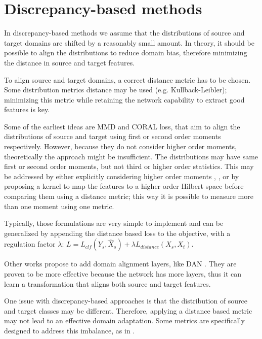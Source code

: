 \section{Discrepancy-based methods}
In discrepancy-based methods we assume that the distributions of source and target domains are shifted by a reasonably small amount. In theory, it should be possible to align the distributions to reduce domain bias, therefore minimizing the distance in source and target features.

To align source and target domains, a correct distance metric has to be chosen. Some distribution metrics  distance may be used (e.g. Kullback-Leibler); minimizing this metric while retaining the network capability to extract good features is key.

Some of the earliest ideas are MMD \cite[Tzeng et al.]{mmd} and CORAL \cite[Sun et al.]{coral} loss, that aim to align the distributions of source and target using first or second order moments respectively.
However, because they do not consider higher order moments, theoretically the approach might be insufficient. The distributions may have same first or second order moments, but not third or higher order statistics. This may be addressed by either explicitly considering higher order moments \cite[Zellinger et al.]{Zellinger_2019}, \cite[Chen et al.]{hmmd}, or by  proposing a kernel \cite[Wang et al]{kernel} to map the features to a higher order Hilbert space before comparing them using a distance metric; this way it is possible to measure more than one moment using one metric.

Typically, those formulations are very simple to implement and can be generalized by appending the distance based loss to the objective, with a regulation factor $\lambda$:
$ L = L_{clf}(Y_s,\hat X_s) + \lambda L_{distance}(X_s,X_t)$.

Other works propose to add domain alignment layers, like DAN \cite[Long et al]{DAN}. They are proven to be more effective because the network has more layers, thus it can learn a transformation that aligns both source and target features.

One issue with discrepancy-based approaches is that the distribution of source and target classes may be different. Therefore, applying a distance based metric may not lead to an effective domain adaptation. Some metrics are specifically designed to address this imbalance, as in \cite[Balaji et al.]{homm}.

